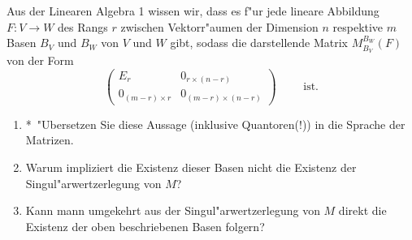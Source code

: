 \documentclass[a4,11pt]{article}
\newcommand{\bonusitem}{\item\hspace*{-2.4mm}*\ }
\begin{document}
\vspace*{-17mm}
{
\kopf
}



\begin{aufgabe}[4 Punkte]
Aus der Linearen Algebra 1 wissen wir, dass es f"ur jede lineare
Abbildung $F : V \to W$ des Rangs $r$ zwischen Vektorr"aumen der
Dimension $n$ respektive $m$ Basen $B_V$ und $B_W$ von $V$ und $W$
gibt, sodass die darstellende Matrix $M_{B_V}^{B_W}(F)$ von der Form
$$ \left( \begin{smallmatrix}
    E_r & 0_{r \times (n-r)} \\
    0_{(m-r) \times r} & 0_{(m-r) \times (n-r)}
  \end{smallmatrix} \right) \qquad \text{ ist.}$$
\begin{enumerate}
\addtocounter{enumi}{-1}
\bonusitem "Ubersetzen Sie diese Aussage (inklusive Quantoren(!)) in
die Sprache der Matrizen.
\item
Warum impliziert die Existenz dieser Basen nicht die Existenz der
Singul"arwertzerlegung von $M$?
\item
Kann mann umgekehrt aus der Singul"arwertzerlegung von $M$ direkt die
Existenz der oben beschriebenen Basen folgern?
\end{enumerate}
\end{aufgabe}
\end{document}
